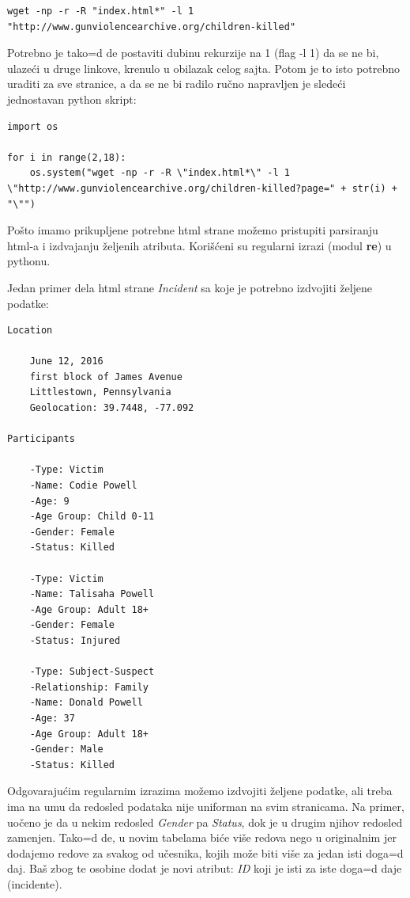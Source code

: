 \documentclass[12pt, a4paper]{article}
\def\dj{\leavevmode\setbox0=\hbox{d}\kern0pt
\rlap{\kern.215em\raise.46\ht0\hbox{-}}d}
\begin{document}
\begin{verbatim}
wget -np -r -R "index.html*" -l 1 "http://www.gunviolencearchive.org/children-killed"
\end{verbatim}
Potrebno je tako\dj e postaviti dubinu rekurzije na 1 (flag -l 1) da se ne bi, ulaze\' ci u druge linkove, krenulo u obilazak celog sajta. Potom je to isto potrebno uraditi za sve stranice, a da se ne bi radilo ru\v cno napravljen je slede\' ci jednostavan python skript:

\begin{lstlisting}
import os

for i in range(2,18):
    os.system("wget -np -r -R \"index.html*\" -l 1  \"http://www.gunviolencearchive.org/children-killed?page=" + str(i) + "\"")
\end{lstlisting}
Po\v sto imamo prikupljene potrebne html strane mo\v zemo pristupiti parsiranju html-a i izdvajanju \v zeljenih atributa. Kori\v s\' ceni su regularni izrazi (modul \textbf{re}) u pythonu.

\break
Jedan primer dela html strane \textit{Incident} sa koje je potrebno izdvojiti \v zeljene podatke:

\begin{verbatim}
Location

    June 12, 2016
    first block of James Avenue
    Littlestown, Pennsylvania
    Geolocation: 39.7448, -77.092

Participants

    -Type: Victim
    -Name: Codie Powell
    -Age: 9
    -Age Group: Child 0-11
    -Gender: Female
    -Status: Killed

    -Type: Victim
    -Name: Talisaha Powell
    -Age Group: Adult 18+
    -Gender: Female
    -Status: Injured

    -Type: Subject-Suspect
    -Relationship: Family
    -Name: Donald Powell
    -Age: 37
    -Age Group: Adult 18+
    -Gender: Male
    -Status: Killed
\end{verbatim}

Odgovaraju\' cim regularnim izrazima mo\v zemo izdvojiti \v zeljene podatke, ali treba ima na umu da redosled podataka nije uniforman na svim stranicama. Na primer, uo\v ceno je da u nekim redosled \textit{Gender} pa \textit{Status}, dok je u drugim njihov redosled zamenjen.
\break
Tako\dj e, u novim tabelama bi\' ce vi\v se redova nego u originalnim jer dodajemo redove za svakog od u\v cesnika, kojih mo\v ze biti vi\v se za jedan isti doga\dj aj. Ba\v s zbog te osobine dodat je novi atribut: \textit{ID} koji je isti za iste doga\dj aje (incidente).
\break
\end{document}
